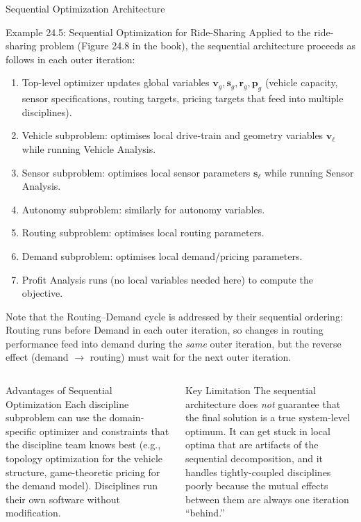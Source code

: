 \documentclass[aspectratio=169,10pt]{beamer}
\begin{document}
\begin{frame}[allowframebreaks]{Sequential Optimization Architecture}
  \begin{exampleblock}{Example 24.5: Sequential Optimization for Ride-Sharing}
    Applied to the ride-sharing problem (Figure 24.8 in the book), the
    sequential architecture proceeds as follows in each outer iteration:
    \begin{enumerate}
      \item Top-level optimizer updates global variables
            $\mathbf{v}_g, \mathbf{s}_g, \mathbf{r}_g, \mathbf{p}_g$
            (vehicle capacity, sensor specifications, routing targets,
            pricing targets that feed into multiple disciplines).
      \item Vehicle subproblem: optimises local drive-train and geometry
            variables $\mathbf{v}_\ell$ while running Vehicle Analysis.
      \item Sensor subproblem: optimises local sensor parameters
            $\mathbf{s}_\ell$ while running Sensor Analysis.
      \item Autonomy subproblem: similarly for autonomy variables.
      \item Routing subproblem: optimises local routing parameters.
      \item Demand subproblem: optimises local demand/pricing parameters.
      \item Profit Analysis runs (no local variables needed here) to
            compute the objective.
    \end{enumerate}
    Note that the Routing--Demand cycle is addressed by their sequential
    ordering: Routing runs before Demand in each outer iteration, so
    changes in routing performance feed into demand during the \emph{same}
    outer iteration, but the reverse effect (demand $\to$ routing) must
    wait for the next outer iteration.
  \end{exampleblock}

  \begin{columns}[T]
    \begin{block}{Advantages of Sequential Optimization}
      Each discipline subproblem can use the domain-specific optimizer
      and constraints that the discipline team knows best (e.g., topology
      optimization for the vehicle structure, game-theoretic pricing for
      the demand model).  Disciplines run their own software without
      modification.
    \end{block}

    \begin{alertblock}{Key Limitation}
      The sequential architecture does \emph{not} guarantee that the final
      solution is a true system-level optimum.  It can get stuck in local
      optima that are artifacts of the sequential decomposition, and it
      handles tightly-coupled disciplines poorly because the mutual effects
      between them are always one iteration ``behind.''
    \end{alertblock}
  \end{columns}

\end{frame}
\end{document}

